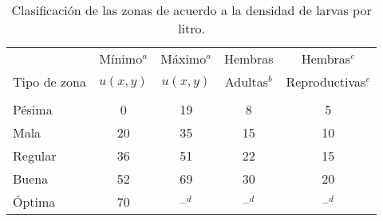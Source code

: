 \begin{table}
    \begin{minipage}{\textwidth}
\begin{center}
    \caption{\label{tab:cap4-puntaje-zona} Clasificación de las zonas de acuerdo a la densidad de larvas por litro.}
    \begin{tabular}{p{3cm} c c c c}
        \\
                     & Mínimo$^a$ & Máximo$^a$ & Hembras     & Hembras$^c$ \\
        Tipo de zona & $u(x,y)$   & $u(x,y)$   & Adultas$^b$ & Reproductivas$^c$ \\
        \hline
        \hline\\
        Pésima  & 0  & 19 & 8  & 5 \\
        Mala    & 20 & 35 & 15 & 10\\
        Regular & 36 & 51 & 22 & 15\\
        Buena   & 52 & 69 & 30 & 20\\
        Óptima  & 70 & --$^d$ & --$^d$ & --$^d$\\
    \end{tabular}
\end{center}
    \end{minipage}
\end{table}
